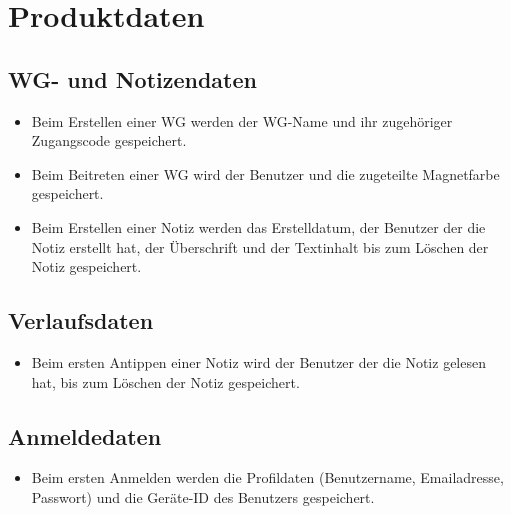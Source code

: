 \documentclass[a4paper]{scrreprt}
\begin{document}
    \chapter{Produktdaten}
        \section{WG- und Notizendaten}
        \begin{itemize}
        \item Beim Erstellen einer WG werden der WG-Name und ihr zugehöriger Zugangscode gespeichert.
		\item Beim Beitreten einer WG wird der Benutzer und die zugeteilte Magnetfarbe gespeichert.
		\item Beim Erstellen einer Notiz werden das Erstelldatum, der Benutzer der die Notiz erstellt hat, der Überschrift und der Textinhalt bis zum Löschen der Notiz gespeichert.
        \end{itemize}
       
		\section{Verlaufsdaten}
		\begin{itemize}
		\item Beim ersten Antippen einer Notiz wird der Benutzer der die Notiz gelesen hat, bis zum Löschen der Notiz gespeichert.
		\end{itemize}
        
        \section{Anmeldedaten}
        \begin{itemize}
        \item Beim ersten Anmelden werden die Profildaten (Benutzername, Emailadresse, Passwort) und die Geräte-ID des Benutzers gespeichert.
        \end{itemize}
\end{document}
